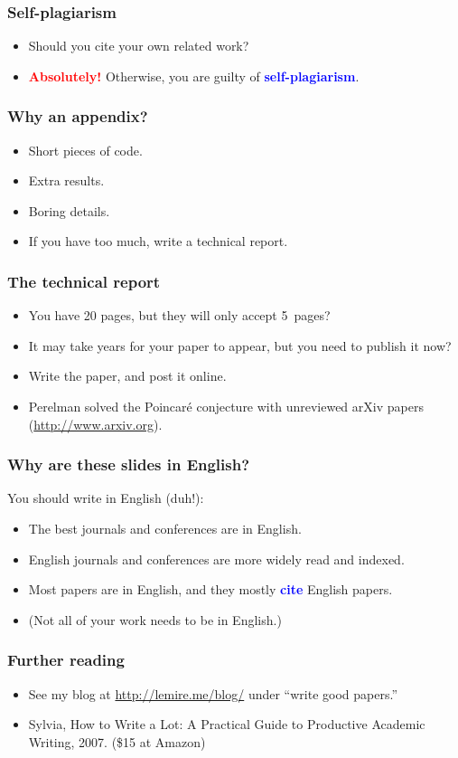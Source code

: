 \documentclass[handout]{beamer}
\newcommand{\vimportant}[1]{\textcolor{red}{\textbf{#1}}}
\newcommand{\important}[1]{\textcolor{blue}{\textbf{#1}}}
\begin{document}
\frame
{
  \frametitle{Self-plagiarism}
   \begin{itemize}
  \item<1-> Should you cite your own related work?
  \item<2-> \vimportant{Absolutely!} Otherwise, you are guilty of \important{self-plagiarism}.
    \end{itemize}
}

\frame
{
  \frametitle{Why an appendix?}

  \begin{itemize}
  \item<1-> Short pieces of code.
    \item<2-> Extra results.
    \item<3-> Boring details.
        \item<4-> If you have too much, write a technical report.
  \end{itemize}
}

\frame
{
  \frametitle{The technical report}

  \begin{itemize}
  \item<1-> You have 20 pages, but they will only accept 5~pages?
    \item<2-> It may take years for your paper to appear, but you need to publish it now?
    \item<3-> Write the paper, and post it online.
        \item<4-> Perelman solved the Poincar\'e conjecture with unreviewed arXiv papers (\url{http://www.arxiv.org}).
  \end{itemize}
}

\frame
{
  \frametitle{Why are these slides in English?}
  You should write in English (duh!):
  \begin{itemize}
  \item<1-> The best journals and conferences are in English.
    \item<2-> English journals and conferences are more widely read and indexed.
    \item<3-> Most papers are in English, and they mostly \important{cite} English papers.
    \item<4-> (Not all of your work needs to be in English.)
  \end{itemize}
}



\frame
{
  \frametitle{Further reading}

  \begin{itemize}
  \item<1-> See my blog at \url{http://lemire.me/blog/} under ``write good papers.''
    \item<2-> Sylvia, How to Write a Lot: A Practical Guide to Productive Academic Writing, 2007. (\$15 at Amazon)
  \end{itemize}
}


%
%
%
%
%

\end{document}
